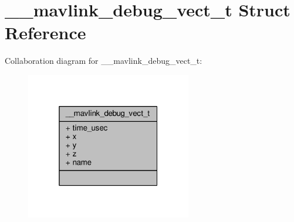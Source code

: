 \hypertarget{struct____mavlink__debug__vect__t}{\section{\+\_\+\+\_\+mavlink\+\_\+debug\+\_\+vect\+\_\+t Struct Reference}
\label{struct____mavlink__debug__vect__t}
}


Collaboration diagram for \+\_\+\+\_\+mavlink\+\_\+debug\+\_\+vect\+\_\+t\+:
\nopagebreak
\begin{figure}[H]
\begin{center}
\leavevmode
\includegraphics[width=205pt]{struct____mavlink__debug__vect__t__coll__graph}
\end{center}
\end{figure}
